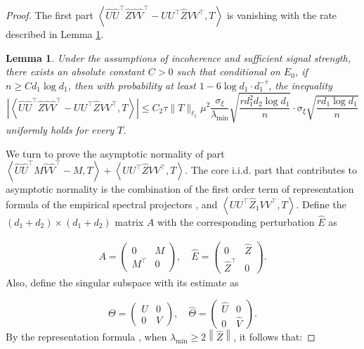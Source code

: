 \documentclass[12pt]{article}
\newcommand{\abs}[1]{\left\lvert#1\right\rvert}
\newcommand{\norm}[1]{\left\lVert#1\right\rVert}
\newtheorem{Lemma}{Lemma}
\theoremstyle{plain}
\begin{document}
\begin{proof}
The first part $\left\langle \widehat{U}\widehat{U}^\top \widehat{Z} \widehat{V}\widehat{V}^\top - UU^\top \widehat{Z}VV^\top, T \right\rangle$ is vanishing with the rate described in Lemma \ref{lemma:vanishing-part}.

\begin{Lemma}\label{lemma:vanishing-part}
        Under the assumptions of incoherence and sufficient signal strength, there exists an absolute constant $C>0$ such that conditional on $E_0$, if $n \geq C d_1 \log d_1$, then with probability at least $1-6 \log d_1 \cdot d_1^{-\tau}$, the inequality 
$$
 \abs{\left\langle \widehat{U}\widehat{U}^\top \widehat{Z} \widehat{V}\widehat{V}^\top - UU^\top \widehat{Z}VV^\top, T \right\rangle}  \leq C_2 \tau \|T\|_{\ell_1} \mu^2 \frac{\sigma_{\xi}}{\lambda_{\min}} \sqrt{\frac{r d_1^2 d_2 \log d_1}{n}} \cdot \sigma_{\xi} \sqrt{\frac{r d_1 \log d_1}{n}}
$$
uniformly holds for every $T$.
    \end{Lemma}


We turn to prove the asymptotic normality of part $\left\langle \widehat{U}\widehat{U}^\top M \widehat{V}\widehat{V}^\top - M, T \right\rangle + \left\langle UU^\top \widehat{Z}VV^\top, T\right\rangle$. 
The core i.i.d. part that contributes to asymptotic normality is the combination of the first order term of representation formula of the empirical spectral projectors \citep{xia2021normal}, and $\left\langle UU^\top \widehat{Z}_1VV^\top, T\right\rangle$. Define the $(d_1+d_2)\times (d_1+d_2)$ matrix $A$ with the corresponding perturbation $\widehat{E}$ as 

\begin{equation*}
    \begin{aligned}
        A = \left( \begin{array}{cc}
            0 & M \\ M^\top & 0 
        \end{array} 
        \right),\quad \widehat{E} = \left( \begin{array}{cc}
            0 & \widehat{Z} \\ \widehat{Z}^\top & 0 
        \end{array}
        \right).
    \end{aligned}
\end{equation*}
Also, define the singular subspace with its estimate as 

$$
\Theta=\left(\begin{array}{cc}
U & 0 \\
0 & V
\end{array}\right),  \quad \widehat{\Theta}=\left(\begin{array}{cc}
\widehat{U} & 0 \\
0 & \widehat{V}
\end{array}\right).
$$
By the representation formula \citep{xia2021normal}, when $\lambda_{\min} \ge 2 \norm{\widehat{Z} } $, it follows that:


\end{proof}
\end{document}
